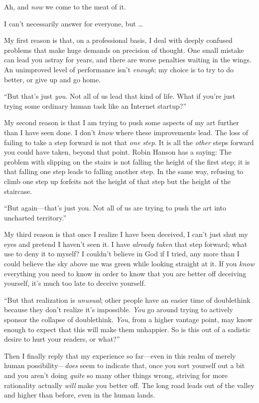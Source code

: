 {
 Ah, and \textit{now} we come to the meat of it.}

{
 I can't necessarily answer for everyone, but
\ldots}

{
 My first reason is that, on a professional basis, I deal with
deeply confused problems that make huge demands on precision of
thought. One small mistake can lead you astray for years, and there are
worse penalties waiting in the wings. An unimproved level of
performance isn't \textit{enough}; my choice is to try
to do better, or give up and go home.}

{
 ``But that's just \textit{you}.
Not all of us lead that kind of life. What if you're
just trying some ordinary human task like an Internet
startup?''}

{
 My second reason is that I am trying to push some aspects of my
art further than I have seen done. I don't
\textit{know} where these improvements lead. The loss of failing to
take a step forward is not that \textit{one step}. It is all the
\textit{other} steps forward you could have taken, beyond that point.
Robin Hanson has a saying: The problem with slipping on the stairs is
not falling the height of the first step; it is that falling one step
leads to falling another step. In the same way, refusing to climb one
step up forfeits not the height of that step but the height of the
staircase.}

{
 ``But again---that's just you.
Not all of us are trying to push the art into uncharted
territory.''}

{
 My third reason is that once I realize I have been deceived, I
can't just shut my eyes and pretend I
haven't seen it. I have \textit{already taken} that
step forward; what use to deny it to myself? I couldn't
believe in God if I tried, any more than I could believe the sky above
me was green while looking straight at it. If you \textit{know}
everything you need to know in order to know that you are better off
deceiving yourself, it's much too late to deceive
yourself.}

{
 ``But that realization is \textit{unusual}; other
people have an easier time of doublethink because they
don't realize it's impossible.
\textit{You} go around trying to actively sponsor the collapse of
doublethink. \textit{You}, from a higher vantage point, may know enough
to expect that this will make them unhappier. So is this out of a
sadistic desire to hurt your readers, or what?''}

{
 Then I finally reply that my experience so far---even in this
realm of merely human possibility---\textit{does} seem to indicate
that, once you sort yourself out a bit and you aren't
doing \textit{quite} so many other things wrong, striving for more
rationality actually \textit{will} make you better off. The long road
leads out of the valley and higher than before, even in the human
lands.}

